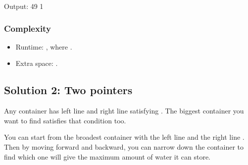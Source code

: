 \documentclass[letterpaper,12pt,english]{book}
\begin{document}
\begin{sphinxVerbatim}[commandchars=\\\{\}]
\end{sphinxVerbatim}

\begin{sphinxVerbatim}[commandchars=\\\{\}]
Output:
49
1
\end{sphinxVerbatim}


\subsubsection{Complexity}
\label{\detokenize{Two_Pointers/08_TP_11_Container_With_Most_Water:complexity}}\begin{itemize}
\item {} 
\sphinxAtStartPar
Runtime: , where .

\item {} 
\sphinxAtStartPar
Extra space: .

\end{itemize}


\subsection{Solution 2: Two pointers}
\label{\detokenize{Two_Pointers/08_TP_11_Container_With_Most_Water:solution-2-two-pointers}}
\sphinxAtStartPar
Any container has left line  and right line  satisfying . The biggest container you want to find satisfies that condition too.

\sphinxAtStartPar
You can start from the broadest container with the left line  and the right line . Then by moving  forward and  backward, you can narrow down the container to find which one will give the maximum amount of water it can store.
\end{document}
